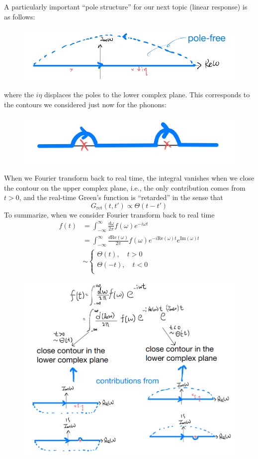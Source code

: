 A particularly important ``pole structure'' for our next topic (linear response) is as follows:
\begin{figure}[ht]
    \centering
    \includegraphics[width=\textwidth]{jupyterbook/data/fig/lec12-fig08.png}
\end{figure}
where the $i\eta$ displaces the poles to the lower complex plane. This corresponds to the contours we considered just now for the phonons:
\begin{figure}[ht]
    \centering
    \includegraphics[width=\textwidth]{jupyterbook/data/fig/lec12-fig09.png}
\end{figure}
When we Fourier transform back to real time, the integral vanishes when we close the contour on the upper complex plane, i.e., the only contribution comes from $t>0$, and the real-time Green's function is ``retarded'' in the sense that
\[ G_{\mathrm{ret}}\left( t,t' \right) \propto \Theta \left( t-t' \right) \]
To summarize, when we consider Fourier transform back to real time
\begin{align*}
    f\left( t \right) &=\int_{-\infty}^{\infty}{\frac{d\omega}{2\pi}f\left( \omega \right) e^{-i\omega t}}\\
    &=\int_{-\infty}^{\infty}{\frac{d\mathrm{Re}\left( \omega \right)}{2\pi}f\left( \omega \right) e^{-i\mathrm{Re}\left( \omega \right) t}e^{\mathrm{Im}\left( \omega \right) t}}\\
    &\sim \begin{cases}
        \Theta \left( t \right) ,\quad t>0\\
        \Theta \left( -t \right) ,\quad t<0\\
    \end{cases}
\end{align*}
\begin{figure}[ht]
    \centering
    \includegraphics[width=\textwidth]{jupyterbook/data/fig/lec12-fig10.png}
\end{figure}
